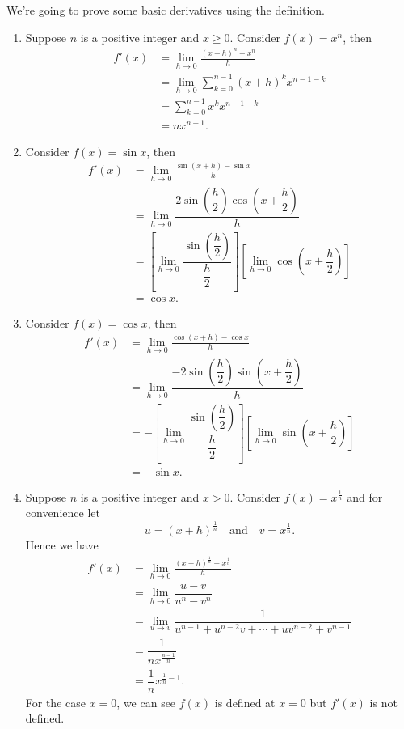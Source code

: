 	\begin{exampleenv}
		We're going to prove some basic derivatives using the definition.
		\begin{enumerate}
			\item Suppose $n$ is a positive integer and $x\ge 0$. Consider $f(x)=x^n$, then
			\[
			\begin{aligned}
				f'(x) &= \lim_{h\to 0} \frac{(x+h)^n - x^n}{h}\\ &= \lim_{h\to 0} \sum_{k=0}^{n-1} (x+h)^k x^{n-1-k}\\ &= \sum_{k=0}^{n-1} x^k x^{n-1-k}\\ &= n x^{n-1}.
			\end{aligned}
			\]
			\item Consider $f(x)=\sin x$, then
			\[
			\begin{aligned}
				f'(x) &= \lim_{h\to 0} \frac{\sin(x+h) - \sin x}{h}\\[6pt] 
				&= \lim_{h\to 0} \dfrac{2\sin\left(\dfrac{h}{2}\right)\cos\left(x+\dfrac{h}{2}\right)}{h}\\[6pt] 
				&= \left[ \lim_{h \to 0} \dfrac{\sin\left(\dfrac{h}{2}\right)}{\dfrac{h}{2}}\right] \left[\lim_{h \to 0} \cos\left(x+\dfrac{h}{2}\right)\right]  \\ 
				&= \cos x.
			\end{aligned}
			\]
			\item Consider $f(x)=\cos x$, then
			\[
			\begin{aligned}
				f'(x) &= \lim_{h\to 0} \frac{\cos(x+h) - \cos x}{h}\\[6pt] 
				&= \lim_{h\to 0} \dfrac{-2\sin\left(\dfrac{h}{2}\right)\sin\left(x+\dfrac{h}{2}\right)}{h}\\[6pt] 
				&= -\left[ \lim_{h \to 0} \dfrac{\sin\left(\dfrac{h}{2}\right)}{\dfrac{h}{2}}\right] \left[\lim_{h \to 0} \sin\left(x+\dfrac{h}{2}\right)\right]  \\ 
				&= -\sin x.
			\end{aligned}
			\]
			\item Suppose $n$ is a positive integer and $x>0$. Consider $f(x)=x^{\frac{1}{n}}$ and for convenience let 
			\[
			u=\left( x+h \right)^{\frac{1}{n}} \quad\text{and}\quad v=x^{\frac{1}{n}}.
			\]
			Hence we have
			\[
			\begin{aligned}
				f'(x) &= \lim_{h\to 0} \frac{(x+h)^{\frac{1}{n}} - x^{\frac{1}{n}}}{h}\\[6pt] 
				&= \lim_{h\to 0} \dfrac{u - v}{u^n - v^n} \\[6pt] 
				&= \lim_{u\to v} \dfrac{1}{u^{n-1} + u^{n-2}v + \cdots + uv^{n-2} + v^{n-1}} \\[6pt]
				&= \dfrac{1}{n x^{\frac{n-1}{n}}}\\[6pt]
				&= \dfrac{1}{n} x^{\frac{1}{n}-1}.
			\end{aligned}
			\]
			For the case $x=0$, we can see $f(x)$ is defined at $x=0$ but $f'(x)$ is not defined.
		\end{enumerate}
	\end{exampleenv}

